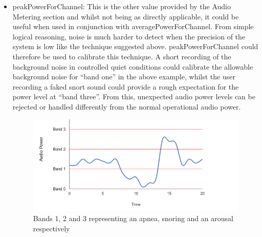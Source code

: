 \begin{itemize}
\item peakPowerForChannel: This is the other value provided by the Audio Metering section and whilst not being as directly applicable, it could be useful when used in conjunction with averagePowerForChannel. From simple logical reasoning, noise is much harder to detect when the precision of the system is low like the technique suggested above. peakPowerForChannel could therefore be used to calibrate this technique. A short recording of the background noise in controlled quiet conditions could calibrate the allowable background noise for ``band one'' in the above example, whilst the user recording a faked snort sound could provide a rough expectation for the power level at ``band three''. From this, unexpected audio power levels can be rejected or handled differently from the normal operational audio power.
\begin{figure}[ht!]
		\centering
			\includegraphics[width=1\textwidth]{drawings/Band_graph.png}
		\caption{Bands 1, 2 and 3 representing an apnea, snoring and an arousal respectively}
		\label{fig:bandGraph}
	\end{figure}
\end{itemize}
